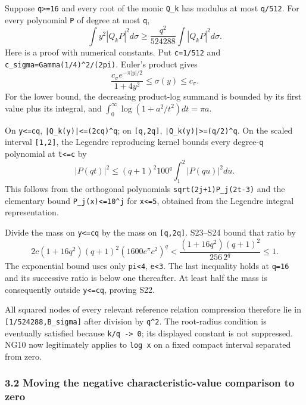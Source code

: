 \documentclass[11pt]{article}
\begin{document}
Suppose \texttt{q\textgreater{}=16} and every root of the monic \texttt{Q\_k} has modulus at most \texttt{q/512}. For every polynomial \texttt{P} of degree at most \texttt{q}, \[
 \boxed{\int y^2|Q_kP|^2d\sigma
 \ge\frac{q^2}{524288}\int|Q_kP|^2d\sigma.}                        \tag{S22}
\] Here is a proof with numerical constants. Put \texttt{c=1/512} and \nolinkurl{c_sigma=Gamma(1/4)^2/(2pi)}. Euler's product gives \[
 \frac{c_\sigma e^{-\pi|y|/2}}{1+4y^2}\le\sigma(y)\le c_\sigma.   \tag{S23}
\] For the lower bound, the decreasing product-log summand is bounded by its first value plus its integral, and \(\int_0^\infty\log(1+a^2/t^2)dt=\pi a\).

On \texttt{\textbar{}y\textbar{}\textless{}=cq}, \nolinkurl{|Q_k(y)|<=(2cq)^q}; on \texttt{{[}q,2q{]}}, \nolinkurl{|Q_k(y)|>=(q/2)^q}. On the scaled interval \texttt{{[}1,2{]}}, the Legendre reproducing kernel bounds every degree-\texttt{q} polynomial at \texttt{\textbar{}t\textbar{}\textless{}=c} by \[
 |P(qt)|^2\le(q+1)^2 100^q\int_1^2|P(qu)|^2du.                   \tag{S24}
\] This follows from the orthogonal polynomials \nolinkurl{sqrt(2j+1)P_j(2t-3)} and the elementary bound \texttt{\textbar{}P\_j(x)\textbar{}\textless{}=10\^{}j} for \texttt{\textbar{}x\textbar{}\textless{}=5}, obtained from the Legendre integral representation.

Divide the mass on \texttt{\textbar{}y\textbar{}\textless{}=cq} by the mass on \texttt{{[}q,2q{]}}. S23--S24 bound that ratio by \[
 2c(1+16q^2)(q+1)^2(1600e^\pi c^2)^q
 <\frac{(1+16q^2)(q+1)^2}{256\,2^q}\le1.                         \tag{S25}
\] The exponential bound uses only \texttt{pi\textless{}4}, \texttt{e\textless{}3}. The last inequality holds at \texttt{q=16} and its successive ratio is below one thereafter. At least half the mass is consequently outside \texttt{\textbar{}y\textbar{}\textless{}=cq}, proving S22.

All squared nodes of every relevant reference relation compression therefore lie in \nolinkurl{[1/524288,B_sigma]} after division by \texttt{q\^{}2}. The root-radius condition is eventually satisfied because \texttt{k/q\ -\textgreater{}\ 0}; its displayed constant is not suppressed. NG10 now legitimately applies to \texttt{log\ x} on a fixed compact interval separated from zero.

\subsubsection{3.2 Moving the negative characteristic-value comparison to zero}\label{moving-the-negative-characteristic-value-comparison-to-zero}
\end{document}
